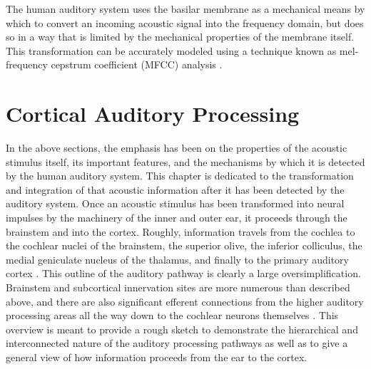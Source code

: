 \documentclass[titlepage]{article}
\begin{document}
    The human auditory system uses the basilar membrane as a mechanical
    means by which to convert an incoming acoustic signal into the frequency
    domain, but does so in a way that is limited by the mechanical properties
    of the membrane itself. This transformation can be accurately modeled using a
    technique known as mel-frequency cepstrum coefficient (MFCC) analysis \cite{Davis1980,Noll1967}.

\section{Cortical Auditory Processing} \label{corticalAuditoryProcessing}

  In the above sections, the emphasis has been on the properties of the acoustic stimulus itself, its important
  features, and the mechanisms by which it is detected by the human auditory system. This chapter is dedicated
  to the transformation and integration of that acoustic information after it has been detected by the auditory
  system. Once an acoustic stimulus has been transformed into neural impulses by the machinery of
  the inner and outer ear, it proceeds through the brainstem and into the cortex. Roughly, information travels
  from the cochlea to the cochlear nuclei of the brainstem, the superior olive, the inferior colliculus,
  the medial geniculate nucleus of the thalamus, and finally to the primary auditory cortex
  \cite{Hickok2007,Webster1992}. This outline of the auditory pathway is clearly a large oversimplification.
  Brainstem and subcortical innervation sites are more numerous than described above, and there are
  also significant efferent connections from the higher auditory processing areas all the way down to the
  cochlear neurons themselves \cite{Kandel2000,Webster1992}. This overview is meant to provide a rough sketch
  to demonstrate the hierarchical and interconnected nature of the auditory processing pathways as well as
  to give a general view of how information proceeds from the ear to the cortex.
\end{document}
